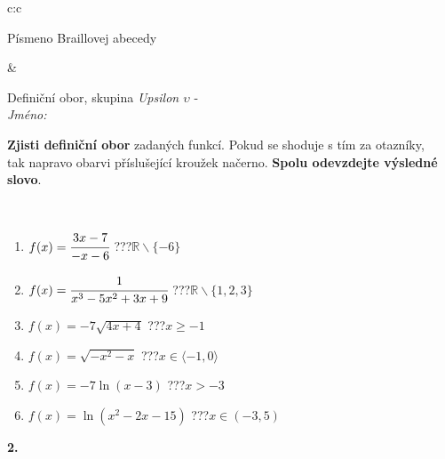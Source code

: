 \documentclass[10pt]{report}
\begin{document}
\begin{tabular}{c:c}
\begin{minipage}[c][104.5mm][t]{0.5\linewidth}
\begin{center}
\begin{minipage}{0.20\linewidth}
\begin{center}
{\small Písmeno Braillovej abecedy}
\end{center}
\end{minipage}
\end{center}
\end{minipage}
&
\begin{minipage}[c][104.5mm][t]{0.5\linewidth}
\begin{center}
\vspace{7mm}
{\huge Definiční obor, skupina \textit{Upsilon $\upsilon$} -}\\[5mm]
\textit{Jméno:}\phantom{xxxxxxxxxxxxxxxxxxxxxxxxxxxxxxxxxxxxxxxxxxxxxxxxxxxxxxxxxxxxxxxxx}\\[5mm]
\begin{minipage}{0.95\linewidth}
\begin{center}
\textbf{Zjisti definiční obor} zadaných funkcí. Pokud se shoduje s tím za otazníky,\\tak napravo obarvi příslušející kroužek načerno. \textbf{Spolu odevzdejte výsledné slovo}.
\end{center}
\end{minipage}
\\[1mm]
\begin{minipage}{0.79\linewidth}
\begin{center}
\begin{varwidth}{\linewidth}
\begin{enumerate}
\normalsizerrr
\item $f(x)=\cfrac{3x-7}{-x-6}$\quad \dotfill\; ???\;\dotfill \quad $\mathbb{R}\smallsetminus\{-6\}$
\item $f(x)=\cfrac{1}{x^3-5x^2+3x+9}$\quad \dotfill\; ???\;\dotfill \quad $\mathbb{R}\smallsetminus\{1,2,3\}$
\item $f(x)=-7\sqrt{4x+4}$\quad \dotfill\; ???\;\dotfill \quad $x\geq-1$
\item $f(x)=\sqrt{-x^2-x}$\quad \dotfill\; ???\;\dotfill \quad $x\in\langle-1 , 0\rangle$
\item $f(x)=-7\ln{(x-3)}$\quad \dotfill\; ???\;\dotfill \quad $x>-3$
\item $f(x)=\ln{(x^2-2x-15)}$\quad \dotfill\; ???\;\dotfill \quad $x\in(-3 , 5)$
\end{enumerate}
\end{varwidth}
\end{center}
\end{minipage}
\begin{minipage}{0.20\linewidth}
\begin{center}
{\Huge\bfseries 2.} \\[2mm]

\end{center}
\end{minipage}
\end{center}
\end{minipage}
\end{tabular}
\end{document}
